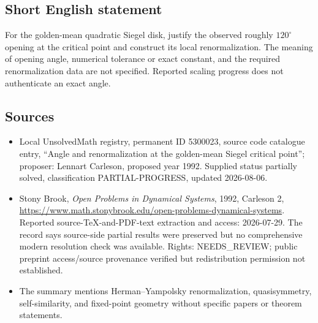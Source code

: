 \documentclass[11pt]{article}
\begin{document}
\subsection{Short English statement}
For the golden-mean quadratic Siegel disk, justify the observed roughly $120^\circ$ opening at the critical point and construct its local renormalization. The meaning of opening angle, numerical tolerance or exact constant, and the required renormalization data are not specified. Reported scaling progress does not authenticate an exact angle.
\subsection{Sources}
\begin{itemize}
\item Local UnsolvedMath registry, permanent ID 5300023, source code catalogue entry, ``Angle and renormalization at the golden-mean Siegel critical point''; proposer: Lennart Carleson, proposed year 1992. Supplied status partially solved, classification PARTIAL-PROGRESS, updated 2026-08-06.
\item Stony Brook, \emph{Open Problems in Dynamical Systems}, 1992, Carleson 2, \url{https://www.math.stonybrook.edu/open-problems-dynamical-systems}. Reported source-TeX-and-PDF-text extraction and access: 2026-07-29. The record says source-side partial results were preserved but no comprehensive modern resolution check was available. Rights: NEEDS\_REVIEW; public preprint access/source provenance verified but redistribution permission not established.
\item The summary mentions Herman--Yampolsky renormalization, quasisymmetry, self-similarity, and fixed-point geometry without specific papers or theorem statements.
\end{itemize}
\end{document}
